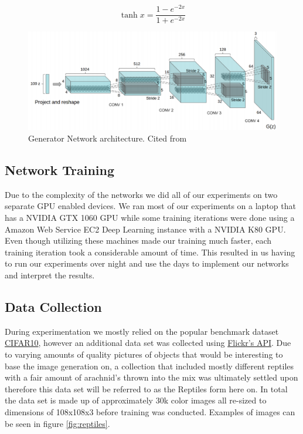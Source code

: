 \begin{equation}
\label{tanh-equation}
\tanh x = \frac{1 - e^{-2x}}{1 + e^{-2x}}
\end{equation}

\begin{figure}[h]
\centering
\includegraphics[width=\textwidth]{figures/DCGAN.png}
\caption{Generator Network architecture. Cited from \cite{DBLP:journals/corr/RadfordMC15} }
\label{fig:architecture}
\end{figure}

\subsection{Network Training}
Due to the complexity of the networks we did all of our experiments on two separate GPU enabled devices. We ran most of our experiments on a laptop that has a NVIDIA GTX 1060 GPU while some training iterations were done using a Amazon Web Service EC2 Deep Learning instance with a NVIDIA K80 GPU. Even though utilizing these machines made our training much faster, each training iteration took a considerable amount of time. This resulted in us having to run our experiments over night and use the days to implement our networks and interpret the results. 

\subsection{Data Collection}
During experimentation we mostly relied on the popular benchmark dataset \href{https://www.cs.toronto.edu/~kriz/cifar.html}{CIFAR10}, however an additional data set was collected using \href{https://www.flickr.com/services/api/}{Flickr's API}. Due to varying amounts of quality pictures of objects that would be interesting to base the image generation on, a collection that included mostly different reptiles with a fair amount of arachnid's thrown into the mix was ultimately settled upon therefore this data set will be referred to as the Reptiles form here on. In total the data set is made up of approximately 30k color images all re-sized to dimensions of 108x108x3 before training was conducted. Examples of images can be seen in figure \ref{fig:reptiles}.

